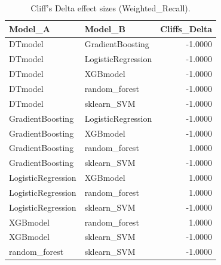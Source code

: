 \begin{table}[t]
\centering
\begin{tabular}{llr}
\toprule
Model_A & Model_B & Cliffs_Delta \\
\midrule
DTmodel & GradientBoosting & -1.0000 \\
DTmodel & LogisticRegression & -1.0000 \\
DTmodel & XGBmodel & -1.0000 \\
DTmodel & random_forest & -1.0000 \\
DTmodel & sklearn_SVM & -1.0000 \\
GradientBoosting & LogisticRegression & -1.0000 \\
GradientBoosting & XGBmodel & -1.0000 \\
GradientBoosting & random_forest & 1.0000 \\
GradientBoosting & sklearn_SVM & -1.0000 \\
LogisticRegression & XGBmodel & 1.0000 \\
LogisticRegression & random_forest & 1.0000 \\
LogisticRegression & sklearn_SVM & -1.0000 \\
XGBmodel & random_forest & 1.0000 \\
XGBmodel & sklearn_SVM & -1.0000 \\
random_forest & sklearn_SVM & -1.0000 \\
\bottomrule
\end{tabular}
\caption{Cliff's Delta effect sizes (Weighted_Recall).}
\label{tab:cliffs_Weighted_Recall}
\end{table}